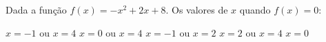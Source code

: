 Dada a função $f(x)=-x^2+2x+8$. Os valores de $x$ quando $f(x)=0$:

$x=-1$ ou $x=4$
$x=0$ ou $x=4$
$x=-1$ ou $x=2$
$x=2$ ou $x=4$
$x=0$


